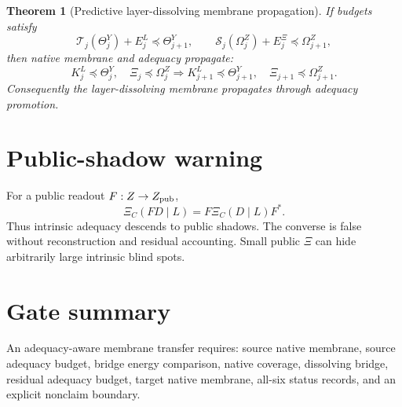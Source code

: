 \documentclass[11pt]{article}
\newtheorem{theorem}{Theorem}
\newcommand{\pre}{\preceq}
\begin{document}
\begin{theorem}[Predictive layer-dissolving membrane propagation]
If budgets satisfy
\[
\mathcal T_j(\Theta^Y_j)+E^L_j\pre\Theta^Y_{j+1},
\qquad
\mathcal S_j(\Omega^Z_j)+E^\Xi_j\pre\Omega^Z_{j+1},
\]
then native membrane and adequacy propagate:
\[
K^L_j\pre\Theta^Y_j,
\quad
\Xi_j\pre\Omega^Z_j
\Longrightarrow
K^L_{j+1}\pre\Theta^Y_{j+1},
\quad
\Xi_{j+1}\pre\Omega^Z_{j+1}.
\]
Consequently the layer-dissolving membrane propagates through adequacy promotion.
\end{theorem}

\section{Public-shadow warning}
For a public readout $F:Z\to Z_{\rm pub}$,
\[
\Xi_C(FD\mid L)=F\Xi_C(D\mid L)F^*.
\]
Thus intrinsic adequacy descends to public shadows.  The converse is false without reconstruction and residual accounting.  Small public $\Xi$ can hide arbitrarily large intrinsic blind spots.

\section{Gate summary}
An adequacy-aware membrane transfer requires: source native membrane, source adequacy budget, bridge energy comparison, native coverage, dissolving bridge, residual adequacy budget, target native membrane, all-six status records, and an explicit nonclaim boundary.
\end{document}

